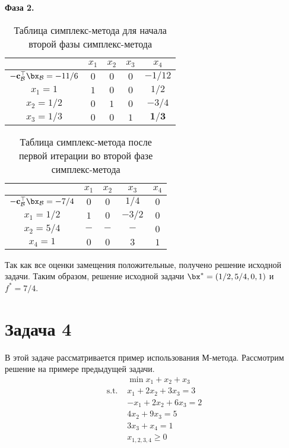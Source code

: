 \documentclass[12pt]{article}
\begin{document}
\textbf{Фаза 2.}

\begin{table}[!ht]
\centering
\caption{Таблица симплекс-метода для начала второй фазы симплекс-метода}
\begin{tabular}{|c|cccc|}
\hline
& $x_1$ & $x_2$ & $x_3$ & $x_4$\\
\hline
$-\mathbf{c}_{\mathcal{B}}^{\top}\bx_{\mathcal{B}} = -11/6$ & $0$ & $0$ & $0$ & $-1/12$ \\
\hline
$x_1 = 1$ & $1$ & $0$ & $0$ & $1/2$ \\
$x_2 = 1/2$ & $0$ & $1$ & $0$ & $-3/4$ \\
$x_3 = 1/3$ & $0$ & $0$ & $1$ & $\mathbf{1/3}$\\
\hline
\end{tabular}
\label{tab::simplex_3_phase2_0}
\end{table}

\begin{table}[!ht]
\centering
\caption{Таблица симплекс-метода после первой итерации во второй фазе симплекс-метода}
\begin{tabular}{|c|cccc|}
\hline
& $x_1$ & $x_2$ & $x_3$ & $x_4$\\
\hline
$-\mathbf{c}_{\mathcal{B}}^{\top}\bx_{\mathcal{B}} = -7/4$ & $0$ & $0$ & $1/4$ & $0$ \\
\hline
$x_1 = 1/2$ & $1$ & $0$ & $-3/2$ & $0$ \\
$x_2 = 5/4$ & $-$ & $-$ & $-$ & $0$ \\
$x_4 = 1$ & $0$ & $0$ & $3$ & $1$\\
\hline
\end{tabular}
\label{tab::simplex_3_phase2_1}
\end{table}

Так как все оценки замещения положительные, получено решение исходной задачи.
Таким образом, решение исходной задачи $\bx^* = (1/2, 5/4, 0, 1)$ и $f^* = 7/4$.


\section{Задача 4}
В этой задаче рассматривается пример использования М-метода.
Рассмотрим решение на примере предыдущей задачи.
\begin{equation*}
\begin{split}
& \min x_1 + x_2 + x_3\\
\text{s.t. } & x_1 + 2x_2 + 3x_3 = 3\\
& -x_1 + 2x_2 + 6x_3 = 2\\
& 4x_2 + 9x_3 = 5\\
& 3x_3 + x_4 = 1\\
& x_{1,2,3,4} \geq 0
\end{split}
\end{equation*}
\end{document}
